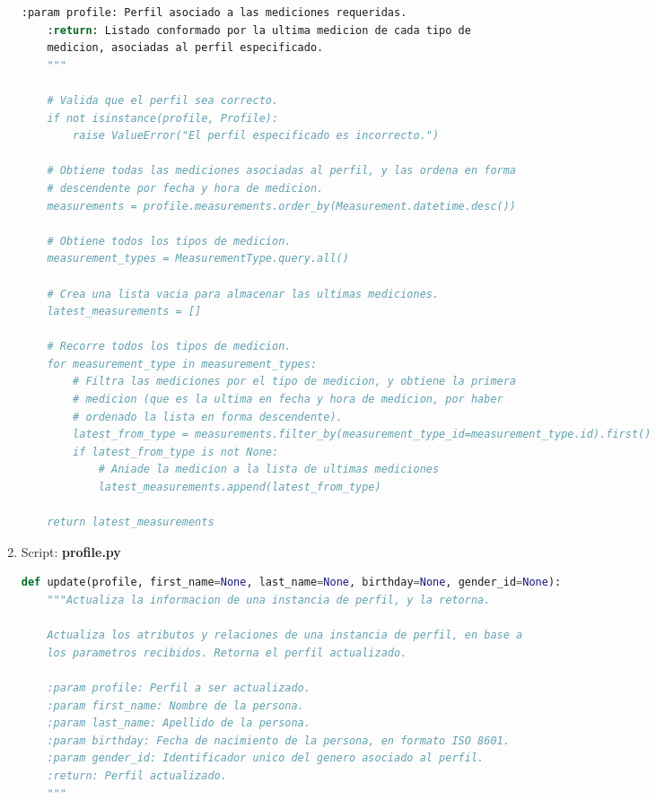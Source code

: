 \begin{enumerate}
\begin{lstlisting}[language=Python]
    :param profile: Perfil asociado a las mediciones requeridas.
    :return: Listado conformado por la ultima medicion de cada tipo de
    medicion, asociadas al perfil especificado.
    """

    # Valida que el perfil sea correcto.
    if not isinstance(profile, Profile):
        raise ValueError("El perfil especificado es incorrecto.")

    # Obtiene todas las mediciones asociadas al perfil, y las ordena en forma
    # descendente por fecha y hora de medicion.
    measurements = profile.measurements.order_by(Measurement.datetime.desc())

    # Obtiene todos los tipos de medicion.
    measurement_types = MeasurementType.query.all()

    # Crea una lista vacia para almacenar las ultimas mediciones.
    latest_measurements = []

    # Recorre todos los tipos de medicion.
    for measurement_type in measurement_types:
        # Filtra las mediciones por el tipo de medicion, y obtiene la primera
        # medicion (que es la ultima en fecha y hora de medicion, por haber
        # ordenado la lista en forma descendente).
        latest_from_type = measurements.filter_by(measurement_type_id=measurement_type.id).first()
        if latest_from_type is not None:
            # Aniade la medicion a la lista de ultimas mediciones
            latest_measurements.append(latest_from_type)

    return latest_measurements
\end{lstlisting}

\item Script: \textbf{profile.py}

\begin{lstlisting}[language=Python]
def update(profile, first_name=None, last_name=None, birthday=None, gender_id=None):
    """Actualiza la informacion de una instancia de perfil, y la retorna.

    Actualiza los atributos y relaciones de una instancia de perfil, en base a
    los parametros recibidos. Retorna el perfil actualizado.

    :param profile: Perfil a ser actualizado.
    :param first_name: Nombre de la persona.
    :param last_name: Apellido de la persona.
    :param birthday: Fecha de nacimiento de la persona, en formato ISO 8601.
    :param gender_id: Identificador unico del genero asociado al perfil.
    :return: Perfil actualizado.
    """


\end{lstlisting}
\end{enumerate}

